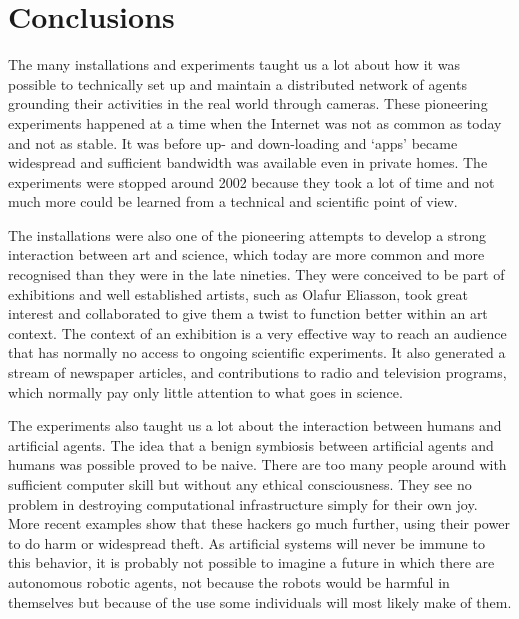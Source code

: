 \section{Conclusions}

The many installations and experiments taught us a lot about how it was possible to technically set up 
and maintain a distributed network of agents grounding their activities in the real world through cameras. 
These pioneering experiments happened at a time when the Internet was not as common as today and not as stable. 
It was before up- and down-loading and `apps' became widespread and sufficient bandwidth was available 
even in private homes. The experiments were stopped around 2002 because
they took a lot of time and not much more could be learned from a technical and scientific point of view. 

The installations were also one of the pioneering attempts to develop a strong interaction between art and science, 
which today are more common and more recognised than they were in the late nineties.
They were conceived to be part of exhibitions and well established artists, such as Olafur Eliasson, took great 
interest and collaborated to give them a twist to function better within an art context. 
The context of an exhibition is a very effective way to reach an audience
that has normally no access to ongoing scientific experiments. It also generated a stream of newspaper articles, 
and contributions to radio and television programs, which normally pay only little attention to what goes in science. 

The experiments also taught us a lot about the interaction between humans and artificial agents. The idea that 
a benign symbiosis between artificial agents and humans was possible proved to be naive. There are too many 
people around with sufficient computer 
skill but without any ethical consciousness. They see no problem in destroying computational infrastructure simply for 
their own joy. More recent examples show that these hackers go much further, using their power to do harm or widespread
theft. As artificial systems will never be immune to this behavior, it is probably not possible to imagine a future in which 
there are autonomous robotic agents, not because the robots would be harmful in themselves but because of 
the use some individuals will most likely make of them. 

